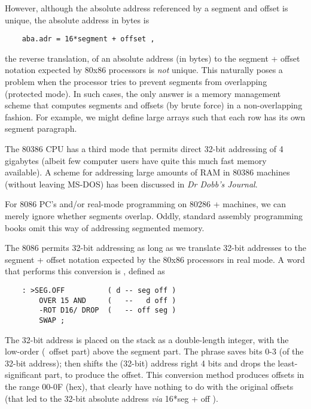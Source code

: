 However, although the absolute address referenced by a segment and offset is unique, \ie the absolute address in bytes is

\begin{lstlisting}
    aba.adr = 16*segment + offset ,
\end{lstlisting}

the reverse translation, of an absolute address (in bytes) to the segment + offset notation expected by 80x86 processors is \textit{not} unique. This naturally poses a problem when the processor tries to prevent segments from overlapping (protected mode). In such cases, the only answer is a memory management scheme that computes segments and offsets (by brute force) in a non-overlapping fashion. For example, we might define large arrays such that each row has its own segment paragraph.

The 80386 CPU has a third mode that permits direct 32-bit addressing of 4 gigabytes (albeit few computer users have quite this much fast memory available). A scheme for addressing large amounts of RAM in 80386 machines (without leaving MS-DOS) has been discussed in \textit{Dr Dobb's Journal}.

For 8086 PC's and/or real-mode programming on 80286 + machines, we can merely ignore whether segments overlap. Oddly, standard assembly programming books omit this way of addressing segmented memory.

The 8086 permits 32-bit addressing as long as we translate 32-bit addresses to the segment + offset notation expected by the 80x86 processors in real mode. A word that performs this conversion is , defined as

\begin{lstlisting}
    : >SEG.OFF          ( d -- seg off )
        OVER 15 AND     (   --   d off )
        -ROT D16/ DROP  (   -- off seg )
        SWAP ;
\end{lstlisting}

The 32-bit address is placed on the stack as a double-length integer, with the low-order (\ie\ offset part) above the segment part. The phrase  saves bits 0-3 (of the 32-bit address);  then shifts the (32-bit) address right 4 bits and drops the least-significant part, to produce the offset. This conversion method produces offsets in the range 00-0F (hex), that clearly have nothing to do with the original offsets (that led to the 32-bit absolute address \textit{via} 16*seg + off ).

